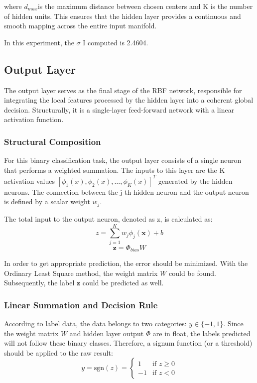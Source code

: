 \documentclass[a4paper, 12pt, twoside]{article}
\begin{document}
where $d_{max}$is the maximum distance between chosen centers and K is the number of hidden 
units. This ensures that the hidden layer provides a continuous and smooth mapping 
across the entire input manifold.

In this experiment, the $\sigma$ I computed is 2.4604.

\subsection{Output Layer}
The output layer serves as the final stage of the RBF network, responsible for integrating 
the local features processed by the hidden layer into a coherent global decision. 
Structurally, it is a single-layer feed-forward network with a linear activation function.
\subsubsection{Structural Composition}

For this binary classification task, the output layer consists of a single neuron 
that performs a weighted summation. The inputs to this layer are the K activation 
values $[\phi_1(x),\phi_2(x),…,\phi_K(x)]^T$
generated by the hidden neurons. The connection between the j-th hidden neuron and 
the output neuron is defined by a scalar weight $w_j$.

The total input to the output neuron, denoted as z, is calculated as: 
\begin{equation} 
    z = \sum_{j=1}^{K} w_j \phi_j(\mathbf{x}) + b 
\end{equation} 
\begin{equation}
    \mathbf{z}=\Phi_{bias}W
\end{equation}

In order to get appropriate prediction, the error should be minimized. With the 
Ordinary Least Square method, the weight matrix $W$ could be found. Subsequently, 
the label $\mathbf{z}$ could be predicted as well.

\subsubsection{Linear Summation and Decision Rule}
According to label data, the data belongs to two categories: $y\in\{-1,1\}$. Since 
the weight matrix $W$ and hidden layer output $\Phi$ are in float, the labels predicted 
will not follow these binary classes. Therefore, a signum function (or a threshold) 
should be applied to the raw result:
\begin{equation}
    y = \text{sgn}(z) = 
    \begin{cases}
        1 & \text{if } z \ge 0 \\
        -1 & \text{if } z < 0
    \end{cases}
\end{equation}
\end{document}
